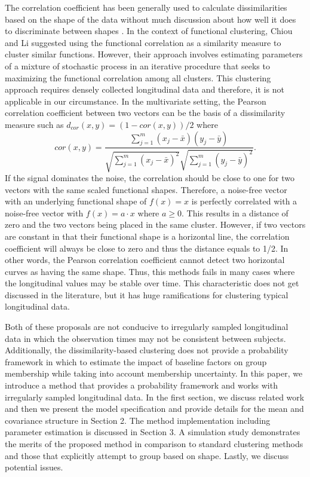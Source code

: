 \documentclass[12pt]{article}
\begin{document}
The correlation coefficient has been generally used to calculate dissimilarities based on the shape of the data without much discussion about how well it does to discriminate between shapes \cite{chouakria2007,  eisen1998, chiou2008}. In the context of functional clustering, Chiou and Li \cite{chiou2008} suggested using the functional correlation as a similarity measure to cluster similar functions. However, their approach involves estimating parameters of a mixture of stochastic process in an iterative procedure that seeks to maximizing the functional correlation among all clusters. This clustering approach requires densely collected longitudinal data and therefore, it is not applicable in our circumstance. In the multivariate setting, the Pearson correlation coefficient between two vectors can be the basis of a dissimilarity measure such as $d_{cor}(x,y) = (1-cor(x,y))/2$ where $$cor(x,y) = \frac{\sum^{m}_{j=1}(x_{j}-\bar{x})(y_{j}-\bar{y})}{\sqrt{\sum^{m}_{j=1}(x_{j}-\bar{x})^{2}}\sqrt{\sum^{m}_{j=1}(y_{j}-\bar{y})^{2}}}.$$
If the signal dominates the noise, the correlation should be close to one for two vectors with the same scaled functional shapes. Therefore, a noise-free vector with an underlying functional shape of $f(x)=x$ is perfectly correlated with a noise-free vector with $f(x)=a\cdot x$ where $a\geq0$. This results in a distance of zero and the two vectors being placed in the same cluster. However, if two vectors are constant in that their functional shape is a horizontal line, the correlation coefficient will always be close to zero and thus the distance equals to 1/2. In other words, the Pearson correlation coefficient cannot detect two horizontal curves as having the same shape. Thus, this methods fails in many cases where the longitudinal values may be stable over time. This characteristic does not get discussed in the literature, but it has huge ramifications for clustering typical longitudinal data.

Both of these proposals are not conducive to irregularly sampled longitudinal data in which the observation times may not be consistent between subjects. Additionally, the dissimilarity-based clustering does not provide a probability framework in which to estimate the impact of baseline factors on group membership while taking into account membership uncertainty.  In this paper, we introduce a method that provides a probability framework and works with irregularly sampled longitudinal data. In the first section, we discuss related work and then we present the model specification and provide details for the mean and covariance structure in Section 2. The method implementation including parameter estimation is discussed in Section 3. A simulation study demonstrates the merits of the proposed method in comparison to standard clustering methods and those that explicitly attempt to group based on shape. Lastly, we discuss potential issues.
\end{document}
